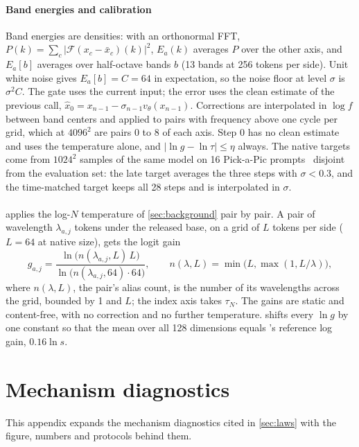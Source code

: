\paragraph{Band energies and calibration}
Band energies are densities: with an orthonormal FFT, $P(k)=\sum_c|\mathcal F(x_c-\bar x_c)(k)|^2$, $E_a(k)$ averages $P$ over the other axis, and $E_a[b]$ averages over half-octave bands $b$ (13 bands at 256 tokens per side). Unit white noise gives $E_a[b]=C=64$ in expectation, so the noise floor at level $\sigma$ is $\sigma^2C$. The gate uses the current input; the error uses the clean estimate of the previous call, $\hat x_0=x_{n-1}-\sigma_{n-1}v_\theta(x_{n-1})$. Corrections are interpolated in $\log f$ between band centers and applied to pairs with frequency above one cycle per grid, which at $4096^2$ are pairs 0 to 8 of each axis. Step 0 has no clean estimate and uses the temperature alone, and $|\ln g-\ln\tau|\le\eta$ always. The native targets come from $1024^2$ samples of the same model on 16 Pick-a-Pic prompts~\citep{kirstain2023pickapic} disjoint from the evaluation set: the late target averages the three steps with $\sigma<0.3$, and the time-matched target keeps all 28 steps and is interpolated in $\sigma$.

\paragraph{\aliastemp}
\aliastemp{} applies the log-$N$ temperature of \cref{sec:background} pair by pair. A pair of wavelength $\lambda_{a,j}$ tokens under the released base, on a grid of $L$ tokens per side ($L=64$ at native size), gets the logit gain
\[
g_{a,j}=\frac{\ln\bigl(n(\lambda_{a,j},L)\,L\bigr)}{\ln\bigl(n(\lambda_{a,j},64)\cdot 64\bigr)},\qquad n(\lambda,L)=\min\bigl(L,\max(1,L/\lambda)\bigr),
\]
where $n(\lambda,L)$, the pair's alias count, is the number of its wavelengths across the grid, bounded by 1 and $L$; the index axis takes $\tau_N$. The gains are static and content-free, with no correction and no further temperature. \aliastemps{} shifts every $\ln g$ by one constant so that the mean over all 128 dimensions equals \sega's reference log gain, $0.16\ln s$.


\section{Mechanism diagnostics}\label{app:mech}

This appendix expands the mechanism diagnostics cited in \cref{sec:laws} with the figure, numbers and protocols behind them.

